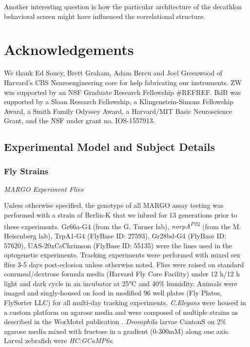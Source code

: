 \documentclass[12pt,letterpaper]{article}
\begin{document}
Another interesting question is how the particular architecture of the decathlon behavioral screen might have influenced the correlational structure.


\subsection{}

\section{Acknowledgements}

We thank Ed Soucy, Brett Graham, Adam Bercu and Joel Greenwood of Harvard’s CBS Neuroengineering core for help fabricating our instruments. ZW was supported by an NSF Graduate Research Fellowship #REFREF. BdB was supported by a Sloan Research Fellowship, a Klingenstein-Simons Fellowship Award, a Smith Family Odyssey Award, a Harvard/MIT Basic Neuroscience Grant, and the NSF under grant no. IOS-1557913.


\subsection{Experimental Model and Subject Details}

\subsubsection{Fly Strains}

\textit{MARGO Experiment Flies}

Unless otherwise specified, the genotype of all MARGO assay testing was performed with a strain of Berlin-K that we inbred for 13 generations prior to these experiments. Gr66a-G4 (from the G. Turner lab), \textit{norpA\textsuperscript{P24}} (from the M. Heisenberg lab), TrpA1-G4 (FlyBase ID: 27593), Gr28bd-G4 (FlyBase ID: 57620), UAS-20xCsChrimson (FlyBase ID: 55135) were the lines used in the optogenetic experiments. Tracking experiments were performed with mixed sex flies 3-5 days post-eclosion unless otherwise noted. Flies were raised on standard conrmeal/dextrose formula media (Harvard Fly Core Facility) under 12 h/12 h light and dark cycle in an incubator at 25°C and 40\% humidity. Animals were imaged and singly-housed on food in modified 96 well plates (Fly Plates, FlySorter LLC) for all multi-day tracking experiments. \textit{C.Elegans} were housed in a custom platform on agarose media and were composed of multiple strains as described in the WorMotel publication \cite{Churgin_Longitudinal_2017}. \textit{Drosophila} larvae CantonS on 2\% agarose media mixed with fructose in a gradient (0-300mM) along one axis. Larval zebrafish were \textit{HC:GCaMP6s}.
\end{document}
